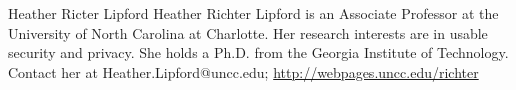 \documentclass[10pt,journal,compsoc]{IEEEtran}
\begin{document}
\begin{IEEEbiography}{Heather Ricter Lipford}
	Heather Richter Lipford is an Associate Professor at the University of
	North Carolina at Charlotte. Her research interests are in usable
	security and privacy. She holds a Ph.D. from the Georgia Institute of
	Technology. 
	Contact her at Heather.Lipford@uncc.edu;
	\url{http://webpages.uncc.edu/richter}
\end{IEEEbiography}










\end{document}
